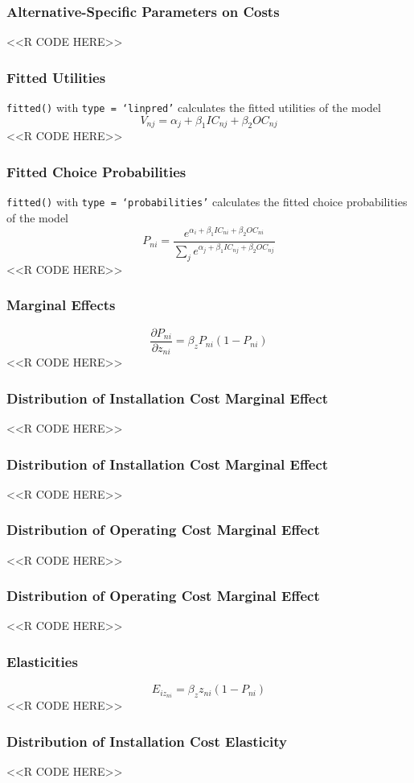 \documentclass{beamer}
\begin{document}
\begin{frame}[fragile]\frametitle{Alternative-Specific Parameters on Costs}
    \vspace{1ex}
    <<R CODE HERE>>
\end{frame}

\begin{frame}[fragile]\frametitle{Fitted Utilities}
    \texttt{fitted()} with \texttt{type = `linpred'} calculates the fitted utilities of the model
    $$V_{nj} = \alpha_j + \beta_1 IC_{nj} + \beta_2 OC_{nj}$$
    <<R CODE HERE>>
\end{frame}

\begin{frame}[fragile]\frametitle{Fitted Choice Probabilities}
    \texttt{fitted()} with \texttt{type = `probabilities'} calculates the fitted choice probabilities of the model
    $$P_{ni} = \frac{e^{\alpha_i + \beta_1 IC_{ni} + \beta_2 OC_{ni}}}{\sum_j e^{\alpha_j + \beta_1 IC_{nj} + \beta_2 OC_{nj}}}$$
    <<R CODE HERE>>
\end{frame}

\begin{frame}[fragile]\frametitle{Marginal Effects}
	$$\frac{\partial P_{ni}}{\partial z_{ni}} = \beta_z P_{ni} (1 - P_{ni})$$
    <<R CODE HERE>>
\end{frame}

\begin{frame}[fragile]\frametitle{Distribution of Installation Cost Marginal Effect}
    <<R CODE HERE>>
\end{frame}

\begin{frame}[fragile]\frametitle{Distribution of Installation Cost Marginal Effect}
    <<R CODE HERE>>
\end{frame}

\begin{frame}[fragile]\frametitle{Distribution of Operating Cost Marginal Effect}
    <<R CODE HERE>>
\end{frame}

\begin{frame}[fragile]\frametitle{Distribution of Operating Cost Marginal Effect}
    <<R CODE HERE>>
\end{frame}

\begin{frame}[fragile]\frametitle{Elasticities}
	$$E_{iz_{ni}} = \beta_z z_{ni} (1 - P_{ni})$$
    <<R CODE HERE>>
\end{frame}

\begin{frame}[fragile]\frametitle{Distribution of Installation Cost Elasticity}
    <<R CODE HERE>>
\end{frame}
\end{document}
